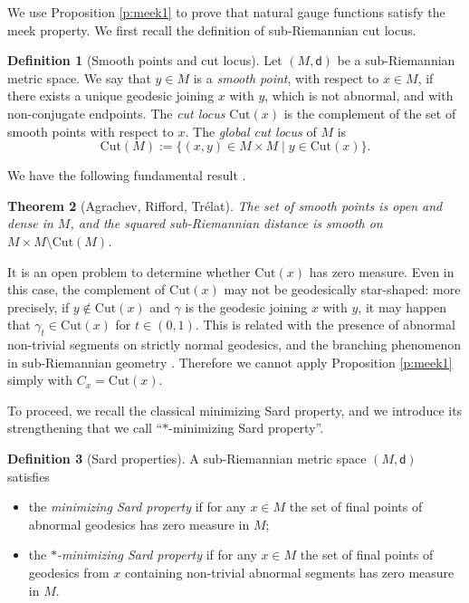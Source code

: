 \documentclass[11pt,a4paper]{article}
\theoremstyle{plain}
\newtheorem{theorem}{Theorem}[section]
\theoremstyle{definition}
\newtheorem{definition}[theorem]{Definition}
\theoremstyle{remark}
\numberwithin{equation}{section}
\newcommand{\Cut}{\mathrm{Cut}}
\newcommand{\sfd}{\mathsf d}
\begin{document}
We use Proposition \ref{p:meek1} to prove that natural gauge functions satisfy the meek property. We first recall the definition of sub-Riemannian cut locus.

\begin{definition}[Smooth points and cut locus]\label{def:cut}
 Let $(M, \sfd)$ be a sub-Riemannian metric space.
We say that $y\in M$ is a \emph{smooth point}, with respect to $x\in M$, if there exists a unique geodesic joining $x$ with $y$, which is not abnormal, and with non-conjugate endpoints. The \emph{cut locus} $\Cut(x)$ is the complement of the set of smooth points with respect to $x$. The \emph{global cut locus} of $M$ is 
\begin{equation}
\Cut(M) := \{(x,y) \in M \times M \mid y \in \Cut(x)\}.
\end{equation}
\end{definition}

We have the following fundamental result \cite{agrasmoothness,RT-MorseSard}.

\begin{theorem}[Agrachev, Rifford, Trélat]\label{thm:agrariffsmooth}
The set of smooth points is open and dense in $M$, and the squared sub-Riemannian distance is smooth on $M\times M \setminus \Cut(M)$.
\end{theorem}

It is an open problem to determine whether $\Cut(x)$ has zero measure. Even in this case, the complement of $\Cut(x)$ may not be geodesically star-shaped: more precisely, if $y\notin \Cut(x)$ and $\gamma$ is the geodesic joining $x$ with $y$, it may happen that $\gamma_t \in \Cut(x)$ for $t\in (0,1)$. This is related with the presence of abnormal non-trivial segments on strictly normal geodesics, and the branching phenomenon in sub-Riemannian geometry \cite{MR-branching}. Therefore we cannot apply Proposition \ref{p:meek1} simply with $C_x=\Cut(x)$. 

To proceed, we recall the classical minimizing Sard property, and we introduce its strengthening that we call ``$*$-minimizing Sard property''.

\begin{definition}[Sard properties]\label{def:Sard} A sub-Riemannian metric space $(M,\sfd)$ satisfies
\begin{itemize}
\item the \emph{minimizing Sard property} if for any $x\in M$ the set of final points of abnormal geodesics has zero measure in $M$;
\item the \emph{$*$-minimizing Sard property} if for any $x\in M$ the set of final points of geodesics from $x$ containing non-trivial abnormal segments has zero measure in $M$.
\end{itemize} 
\end{definition}
\end{document}
